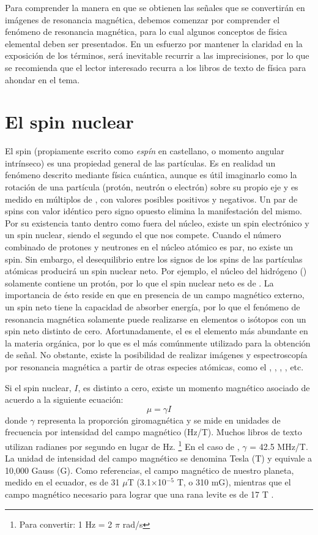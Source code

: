 Para comprender la manera en que se obtienen las señales que se convertirán en imágenes de resonancia magnética, debemos comenzar por comprender el fenómeno de resonancia magnética, para lo cual algunos conceptos de física elemental deben ser presentados. En un esfuerzo por mantener la claridad en la exposición de los términos, será inevitable recurrir a las imprecisiones, por lo que se recomienda que el lector interesado recurra a los libros de texto de física para ahondar en el tema.

\section{El spin nuclear}
El spin (propiamente escrito como \emph{espín} en castellano, o momento angular intrínseco) es una propiedad general de las partículas. Es en realidad un fenómeno descrito mediante física cuántica, aunque es útil imaginarlo como la rotación de una partícula (protón, neutrón o electrón) sobre su propio eje y es medido en múltiplos de , con valores posibles positivos y negativos. Un par de spins con valor idéntico pero signo opuesto elimina la manifestación del mismo. Por su existencia tanto dentro como fuera del núcleo, existe un spin electrónico y un spin nuclear, siendo el segundo el que nos compete. Cuando el número combinado de protones y neutrones en el núcleo atómico es par, no existe un spin. Sin embargo, el desequilibrio entre los signos de los spins de las partículas atómicas producirá un spin nuclear neto. Por ejemplo, el núcleo del hidrógeno () solamente contiene un protón, por lo que el spin nuclear neto es de . La importancia de ésto reside en que en presencia de un campo magnético externo, un spin neto tiene la capacidad de absorber energía, por lo que el fenómeno de resonancia magnética solamente puede realizarse en elementos o isótopos con un spin neto distinto de cero. Afortunadamente, el  es el elemento más abundante en la materia orgánica, por lo que es el más comúnmente utilizado para la obtención de señal. No obstante, existe la posibilidad de realizar imágenes y espectroscopía por resonancia magnética a partir de otras especies atómicas, como el , , , , etc.

Si el spin nuclear, $I$, es distinto a cero, existe un momento magnético asociado de acuerdo a la siguiente ecuación:
\begin{equation}
 \mu = \gamma I
\end{equation}
donde $\gamma$ representa la proporción giromagnética y se mide en unidades de frecuencia por intensidad del campo magnético (Hz/T). Muchos libros de texto utilizan radianes por segundo en lugar de Hz. \footnote{Para convertir: 1 Hz = 2 $\pi$ rad/s} En el caso de , $\gamma$ = 42.5 MHz/T. La unidad de intensidad del campo magnético se denomina Tesla (T) y equivale a 10,000 Gauss (G). Como referencias, el campo magnético de nuestro planeta, medido en el ecuador, es de 31 $\mu$T (3.1$\times$10$^{-5}$ T, o 310 mG), mientras que el campo magnético necesario para lograr que una rana levite es de 17 T \cite{Berry_Geim_1997}.

